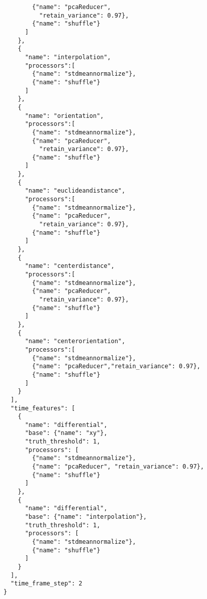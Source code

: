 \begin{multicols}{2}
\begin{verbatim}
        {"name": "pcaReducer",
          "retain_variance": 0.97},
        {"name": "shuffle"}
      ]
    },
    {
      "name": "interpolation",
      "processors":[
        {"name": "stdmeannormalize"},
        {"name": "shuffle"}
      ]
    },
    {
      "name": "orientation",
      "processors":[
        {"name": "stdmeannormalize"},
        {"name": "pcaReducer",
          "retain_variance": 0.97},
        {"name": "shuffle"}
      ]
    },
    {
      "name": "euclideandistance",
      "processors":[
        {"name": "stdmeannormalize"},
        {"name": "pcaReducer",
          "retain_variance": 0.97},
        {"name": "shuffle"}
      ]
    },
    {
      "name": "centerdistance",
      "processors":[
        {"name": "stdmeannormalize"},
        {"name": "pcaReducer",
          "retain_variance": 0.97},
        {"name": "shuffle"}
      ]
    },
    {
      "name": "centerorientation",
      "processors":[
        {"name": "stdmeannormalize"},
        {"name": "pcaReducer","retain_variance": 0.97},
        {"name": "shuffle"}
      ]
    }
  ],
  "time_features": [
    {
      "name": "differential",
      "base": {"name": "xy"},
      "truth_threshold": 1,
      "processors": [
        {"name": "stdmeannormalize"},
        {"name": "pcaReducer", "retain_variance": 0.97},
        {"name": "shuffle"}
      ]
    },
    {
      "name": "differential",
      "base": {"name": "interpolation"},
      "truth_threshold": 1,
      "processors": [
        {"name": "stdmeannormalize"},
        {"name": "shuffle"}
      ]
    }
  ],
  "time_frame_step": 2
}
\end{verbatim}
\end{multicols}
